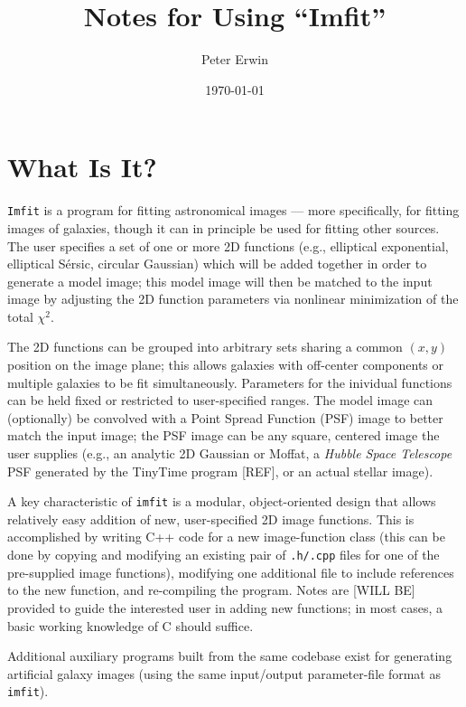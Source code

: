 \documentclass[10pt]{article}
\newcommand{\imfit}{\texttt{imfit}}
\newcommand{\Imfit}{\texttt{Imfit}}
\begin{document}
\title{
  Notes for Using ``Imfit''
}
\author{
  Peter Erwin
}
\date{\today}  %

\maketitle

\section{What Is It?}

\Imfit{} is a program for fitting astronomical images --- more
specifically, for fitting images of galaxies, though it can in principle
be used for fitting other sources. The user specifies a set of one or
more 2D functions (e.g., elliptical exponential, elliptical S\'ersic,
circular Gaussian) which will be added together in order to generate a
model image; this model image will then be matched to the input image by
adjusting the 2D function parameters via nonlinear minimization of the total
$\chi^2$.

The 2D functions can be grouped into arbitrary sets sharing a common $(x,y)$
position on the image plane; this allows galaxies with off-center components
or multiple galaxies to be fit simultaneously. Parameters for the inividual
functions can be held fixed or restricted to user-specified ranges. The
model image can (optionally) be convolved with a Point Spread
Function (PSF) image to better match the input image; the PSF image can
be any square, centered image the user supplies (e.g., an analytic 2D Gaussian
or Moffat, a \textit{Hubble Space Telescope} PSF generated by the TinyTime
program [REF], or an actual stellar image).

A key characteristic of \imfit{} is a modular, object-oriented design
that allows relatively easy addition of new, user-specified 2D image
functions. This is accomplished by writing C++ code for a new
image-function class (this can be done by copying and modifying an
existing pair of \texttt{.h/.cpp} files for one of the pre-supplied
image functions), modifying one additional file to include references to
the new function, and re-compiling the program. Notes are [WILL BE] provided
to guide the interested user in adding new functions; in most cases, a
basic working knowledge of C should suffice.

Additional auxiliary programs built from the same codebase exist for
generating artificial galaxy images (using the same input/output
parameter-file format as \imfit{}).
\end{document}
